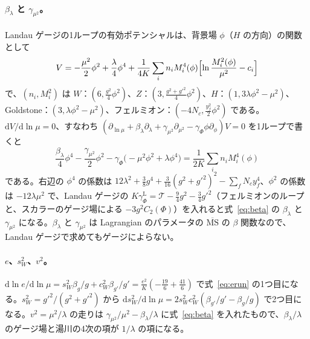 \documentclass[a4paper,10pt]{ltjsarticle}
\newcommand{\dd}{\mathrm{d}}
\newcommand{\MSbar}{\overline{\mathrm{MS}}}
\newcommand{\sw}{s_W}
\newcommand{\cw}{c_W}
\begin{document}
\paragraph{$\beta_\lambda$ と $\gamma_{\mu^2}$。}Landau ゲージの1ループの有効ポテンシャルは、背景場 $\phi$（$H$ の方向）の関数として
\begin{equation*}
V=-\frac{\mu^2}2\phi^2+\frac\lambda4\phi^4+\frac1{4K}\sum_in_iM_i^4(\phi)\Bigl[\ln\frac{M_i^2(\phi)}{\mu^2}-c_i\Bigr]
\end{equation*}
で、$(n_i,M_i^2)$ は $W$：$(6,\frac{g^2}4\phi^2)$、$Z$：$(3,\frac{g^2+g'^2}4\phi^2)$、$H$：$(1,3\lambda\phi^2-\mu^2)$、Goldstone：$(3,\lambda\phi^2-\mu^2)$、フェルミオン：$(-4N_c,\frac{y_f^2}2\phi^2)$ である。$\dd V/\dd\ln\mu=0$、すなわち $(\partial_{\ln\mu}+\beta_\lambda\partial_\lambda+\gamma_{\mu^2}\partial_{\mu^2}-\gamma_\Phi\phi\partial_\phi)V=0$ を1ループで書くと
\begin{equation*}
\frac{\beta_\lambda}4\phi^4-\frac{\gamma_{\mu^2}}2\phi^2-\gamma_\Phi\bigl(-\mu^2\phi^2+\lambda\phi^4\bigr)=\frac1{2K}\sum_in_iM_i^4(\phi)
\end{equation*}
である。右辺の $\phi^4$ の係数は $12\lambda^2+\frac38g^4+\frac3{16}(g^2+g'^2)^2-\sum_fN_cy_f^4$、$\phi^2$ の係数は $-12\lambda\mu^2$ で、Landau ゲージの $K\gamma_\Phi^{\mathrm L}=\mathcal T-\frac94g^2-\frac34g'^2$（フェルミオンのループと、スカラーのゲージ場による $-3g^2C_2(\Phi)$）を入れると式~\eqref{eq:beta} の $\beta_\lambda$ と $\gamma_{\mu^2}$ になる。$\beta_\lambda$ と $\gamma_{\mu^2}$ は Lagrangian のパラメータの $\MSbar$ の $\beta$ 関数なので、Landau ゲージで求めてもゲージによらない。

\paragraph{$e$、$\sw^2$、$v^2$。}$\dd\ln e/\dd\ln\mu=\sw^2\beta_g/g+\cw^2\beta_{g'}/g'=\frac{e^2}K(-\frac{19}6+\frac{41}6)$ で式~\eqref{eq:erun} の1つ目になる。$\sw^2=g'^2/(g^2+g'^2)$ から $\dd\sw^2/\dd\ln\mu=2\sw^2\cw^2(\beta_{g'}/g'-\beta_g/g)$ で2つ目になる。$v^2=\mu^2/\lambda$ の走りは $\gamma_{\mu^2}/\mu^2-\beta_\lambda/\lambda$ に式~\eqref{eq:beta} を入れたもので、$\beta_\lambda/\lambda$ のゲージ場と湯川の4次の項が $1/\lambda$ の項になる。
\end{document}
